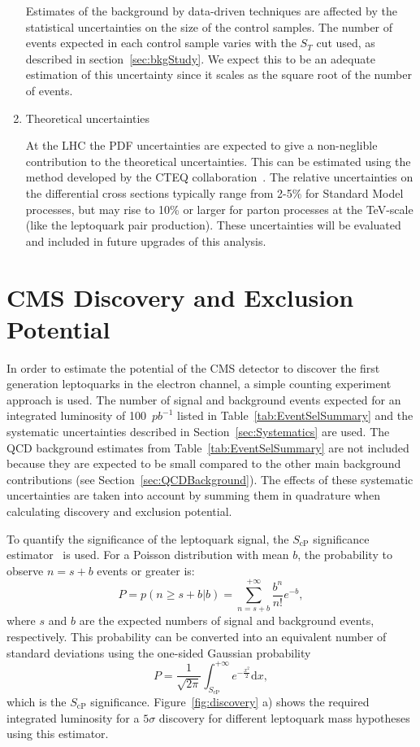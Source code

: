 \documentclass{cmspaper}
\begin{document}
\begin{linenumbers}
\begin{enumerate}
Estimates of the background by data-driven techniques are affected by the statistical
uncertainties on the size of the control samples.
The number of events expected in each control sample varies with the $S_T$ cut used, as 
described in section~\ref{sec:bkgStudy}. 
We expect this to be an adequate estimation of this
uncertainty since it scales as the square root of the number of events.
%
\item Theoretical uncertainties 

At the LHC the PDF uncertainties are expected to give a non-neglible
contribution to the theoretical uncertainties.  This can be estimated 
using the method developed by the CTEQ collaboration~\cite{CTEQreweighting}.
The relative uncertainties on the differential cross sections 
typically range from 2-5\% for Standard Model processes, 
but may rise to 10\% or larger for parton processes at the TeV-scale 
(like the leptoquark pair production).
These uncertainties will be evaluated and included in future upgrades of this analysis.
\end{enumerate}



\section{CMS Discovery and Exclusion Potential} \label{CMSpotential}

In order to estimate the potential of the CMS detector to discover the first generation leptoquarks
in the electron channel, a simple counting experiment approach is used. 
The number of signal and background events expected for an integrated luminosity of
100~$pb^{-1}$ listed in Table~\ref{tab:EventSelSummary} and the systematic uncertainties described 
in Section~\ref{sec:Systematics} are used. 
The QCD background estimates from Table~\ref{tab:EventSelSummary} 
are not included because they are expected to be 
small compared to the other main background contributions (see Section~\ref{sec:QCDBackground}).
The effects of these systematic uncertainties are taken into account
by summing them in quadrature when calculating discovery and exclusion potential.


To quantify the significance of the
leptoquark signal, the 
$S_\text{cP}$ significance estimator~\cite{ref:scp} is used.  
For a Poisson distribution
with mean $b$,
the probability to observe $n=s+b$ events or greater is:
\begin{equation}
P = p(n\geq s+b|b) = \sum_{n=s+b}^{+\infty} \frac{b^n}{n!}e^{-b},
\end{equation}
where $s$ and $b$ are the expected numbers of signal and background events, respectively. This probability can be
converted into an equivalent number of standard deviations using the one-sided Gaussian probability
\begin{equation}
P = \frac{1}{\sqrt{2\pi}}\int_{S_\text{cP}}^{+\infty} e^{-\frac{x^2}{2}}\mathrm{d}x,
\label{eq:ScP}
\end{equation}
which is the $S_\text{cP}$ significance.
Figure~\ref{fig:discovery} a) shows the required integrated luminosity
for a $5\sigma$ discovery for different leptoquark mass hypotheses using this estimator. 


\end{linenumbers}
\end{document}
